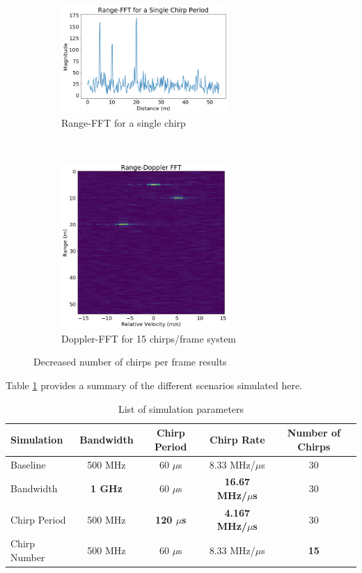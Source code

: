 \begin{figure}[h]
	\centering 
	\begin{subfigure}[c]{0.5\textwidth}
		\centering
		\includegraphics[width=2.5in]{imgs/chirps_range}
		\caption{Range-FFT for a single chirp}
	\end{subfigure}%
	~
	\begin{subfigure}[c]{0.5\textwidth}
		\centering
		\includegraphics[width=2.5in]{imgs/chirps_doppler}
		\caption{Doppler-FFT for 15 chirps/frame system}
	\end{subfigure}
	\caption{Decreased number of chirps per frame results}
	\label{fig:chirps}
\end{figure}

Table \ref{tab:simulations} provides a summary of the different scenarios
simulated here.

\begin{table}[h] 
	\centering
	\caption{List of simulation parameters}
	\begin{tabular}{l|c|c|c|c}
		Simulation & Bandwidth & Chirp Period & Chirp Rate & Number of
		Chirps \\
		\hline
		Baseline&500 MHz&60 $\mu$s&8.33 MHz/$\mu$s&30\\
		Bandwidth&\bf{1 GHz}&60 $\mu$s&\bf{16.67 MHz/$\mu$s}&30\\
		Chirp Period&500 MHz&\bf{120 $\mu$s}&\bf{4.167 MHz/$\mu$s}&30\\
		Chirp Number&500 MHz&60 $\mu$s&8.33 MHz/$\mu$s&\bf{15}\\
	\end{tabular}
	\label{tab:simulations}
\end{table}	
